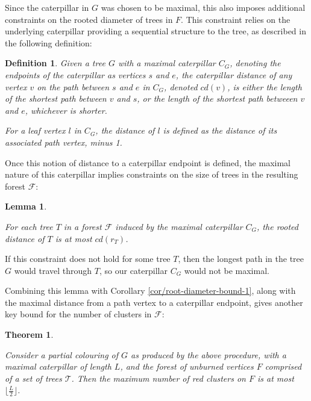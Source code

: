 \documentclass{mpaper}
\newtheorem{definition}{Definition}[section]
\newtheorem{theorem}{Theorem}[section]
\newtheorem{lemma}{Lemma}[section]
\begin{document}
Since the caterpillar in $G$ was chosen to be maximal, this also imposes additional constraints on the rooted diameter of trees in $F$. This constraint relies on the underlying caterpillar providing a sequential structure to the tree, as described in the following definition:

\begin{definition}
\label{def/tree-distance}
Given a tree $G$ with a maximal caterpillar $C_G$, denoting the endpoints of the caterpillar as vertices $s$ and $e$, the \emph{caterpillar distance} of any vertex $v$ on the path between $s$ and $e$ in $C_G$, denoted $cd(v)$, is either the length of the shortest path between $v$ and $s$, or the length of the shortest path betweeen $v$ and $e$, whichever is shorter.

For a leaf vertex $l$ in $C_G$, the distance of $l$ is defined as the distance of its associated path vertex, minus 1.
\end{definition}

Once this notion of distance to a caterpillar endpoint is defined, the maximal nature of this caterpillar implies constraints on the size of trees in the resulting forest $\mathcal{F}$:

\begin{lemma}
\label{def/tree-size-constraint}

For each tree $T$ in a forest $\mathcal{F}$ induced by the maximal caterpillar $C_G$, the rooted distance of $T$ is at most $cd(r_T)$.

\end{lemma}

If this constraint does not hold for some tree $T$, then the longest path in the tree $G$ would travel through $T$, so our caterpillar $C_G$ would not be maximal.

Combining this lemma with Corollary \ref{cor/root-diameter-bound-1}, along with the maximal distance from a path vertex to a caterpillar endpoint, gives another key bound for the number of clusters in $\mathcal{F}$:

\begin{theorem}
\label{thm/root-diameter-bound-2}

Consider a partial colouring of $G$ as produced by the above procedure, with a maximal caterpillar of length $L$, and the forest of unburned vertices $F$ comprised of a set of trees $\mathcal{T}$. Then the maximum number of red clusters on $F$ is at most $\lfloor \frac{L}{2} \rfloor$.

\end{theorem}
\end{document}
